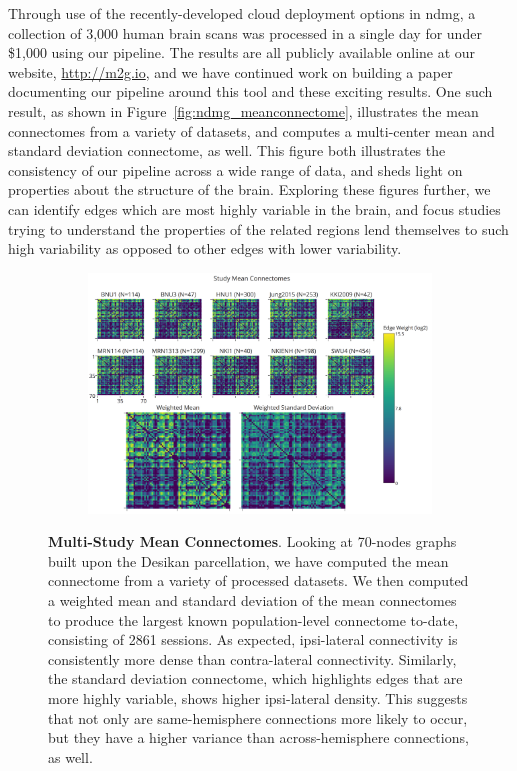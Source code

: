 \documentclass[simplex.tex]{subfiles}
\begin{document}
Through use of the recently-developed cloud deployment options in ndmg, a collection of 3,000 human brain scans was
processed in a single day for under \$1,000 using our pipeline. The results are all publicly available online at our
website, \url{http://m2g.io}, and we have continued work on building a paper documenting our pipeline around this tool
and these exciting results. One such result, as shown in Figure~\ref{fig:ndmg_meanconnectome}, illustrates the mean
connectomes from a variety of datasets, and computes a multi-center mean and standard deviation connectome, as well.
This figure both illustrates the consistency of our pipeline across a wide range of data, and sheds light on properties
about the structure of the brain. Exploring these figures further, we can identify edges which are most highly variable
in the brain, and focus studies trying to understand the properties of the related regions lend themselves to such high
variability as opposed to other edges with lower variability.

\begin{figure}[h!]
\begin{cframed}[lgray]
\centering
\begin{subfigure}[h]{1\textwidth}
\includegraphics[width=\textwidth]{../../figs/fig_meanconnectome.png}
\end{subfigure}
\caption{\textbf{Multi-Study Mean Connectomes}. Looking at 70-nodes graphs built upon the Desikan parcellation, we have
computed the mean connectome from a variety of processed datasets. We then computed a weighted mean and standard
deviation of the mean connectomes to produce the largest known population-level connectome to-date, consisting of 2861
sessions. As expected, ipsi-lateral connectivity is consistently more dense than contra-lateral connectivity.
Similarly, the standard deviation connectome, which highlights edges that are more highly variable, shows higher
ipsi-lateral density. This suggests that not only are same-hemisphere connections more likely to occur, but they have
a higher variance than across-hemisphere connections, as well.}
\label{fig:mean}
\end{cframed}
\end{figure}
\end{document}
